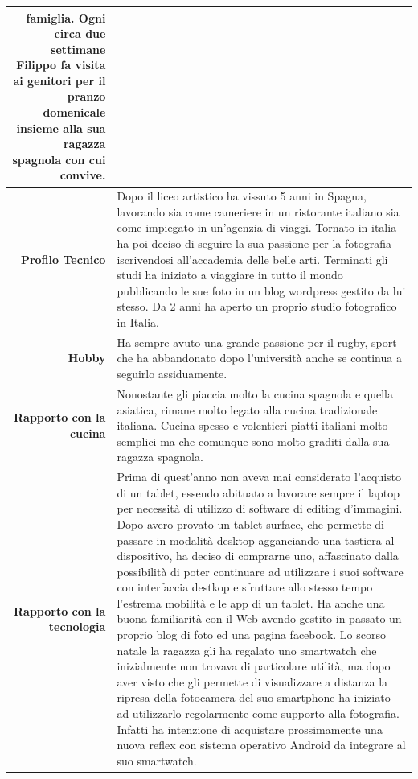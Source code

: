 \begin{table}[H]
\begin{centering}
\begin{tabular} { | r  p{10cm} | }
{famiglia. Ogni circa due settimane Filippo fa visita ai genitori per il
pranzo domenicale insieme alla sua ragazza spagnola con cui convive.} \\
\hline
		\textbf{Profilo Tecnico} & Dopo il liceo artistico ha vissuto 5
anni in Spagna, lavorando sia come cameriere in un ristorante italiano
sia come impiegato in un'agenzia di viaggi. Tornato in italia ha poi
deciso di seguire la sua passione per la fotografia iscrivendosi
all'accademia delle belle arti. Terminati gli studi ha iniziato a
viaggiare in tutto il mondo pubblicando le sue foto in un blog wordpress gestito
da lui stesso. Da 2 anni ha aperto un proprio studio fotografico in
Italia. \\ \hline
		\textbf{Hobby} & Ha sempre avuto una grande passione per il
rugby, sport che ha abbandonato dopo l'università anche se continua a
seguirlo assiduamente. \\ \hline
		\textbf{Rapporto con la cucina} & Nonostante gli piaccia molto
la cucina spagnola e quella asiatica, rimane molto legato alla cucina
tradizionale italiana. Cucina spesso e volentieri piatti italiani molto
semplici ma che comunque sono molto graditi dalla sua ragazza spagnola.
\\ \hline
		\textbf{Rapporto con la tecnologia} & Prima di quest'anno non
aveva mai considerato
l'acquisto di un tablet, essendo abituato a lavorare sempre il laptop 
per necessità di utilizzo di software di editing
d'immagini. Dopo avero provato un tablet surface, che permette di
passare in modalità desktop agganciando una tastiera al dispositivo, ha
deciso di comprarne uno, affascinato dalla possibilità di poter
continuare ad utilizzare i suoi software con interfaccia destkop e
sfruttare allo stesso tempo l'estrema mobilità e le app di un tablet.
Ha anche una buona familiarità con il Web avendo gestito in passato un proprio
blog di foto ed una pagina facebook. Lo scorso natale la ragazza gli ha
regalato uno smartwatch che inizialmente non trovava di particolare
utilità, ma dopo aver visto che gli permette di visualizzare a distanza
la ripresa della fotocamera del suo smartphone ha iniziato ad
utilizzarlo regolarmente come supporto alla fotografia. Infatti ha
intenzione di acquistare prossimamente una nuova reflex con sistema
operativo Android da integrare al suo smartwatch.
\\ \hline
	\end{tabular}
	\end{centering}
\end{table}


